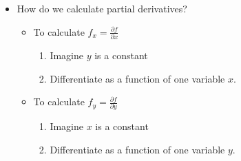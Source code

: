 \documentclass{article}
\begin{document}
\begin{itemize}
	\item How do we calculate partial derivatives?

	\begin{itemize}
		\item To calculate $f_x = \frac{\partial f}{\partial x}$
		\begin{enumerate}
			\item Imagine $y$ is a constant
			\item Differentiate as a function of one variable $x$.
		\end{enumerate}

		\item To calculate $f_y = \frac{\partial f}{\partial y}$
		\begin{enumerate}
			\item Imagine $x$ is a constant
			\item Differentiate as a function of one variable $y$.
		\end{enumerate}
	\end{itemize}

  \end{itemize}
\end{document}
